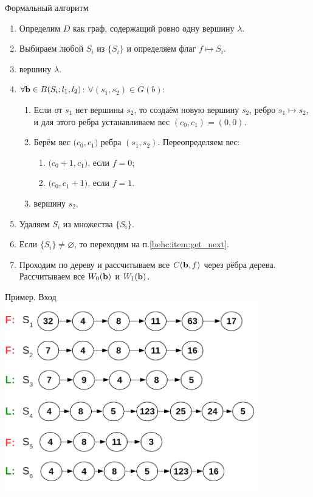 \begin{frame}{Формальный алгоритм}
	\small
	\begin{enumerate}
		\item Определим $D$ как граф, содержащий ровно одну вершину $\lambda$.
		\item Выбираем любой $S_i$ из $\big\{ S_i\big\}$ и определяем флаг $f \longmapsto S_i$.
			\label{behc:item:get_next}
		\item {} вершину $\lambda$.
		\item $\forall \bold b \in B(S_i; l_1, l_2)$:  
		$\forall (s_1, s_2) \in G(b)$: 
		\begin{enumerate}
			\item Если от  $s_1$ нет
			вершины $s_2$, то создаём новую вершину $s_2$, ребро $s_1 \longmapsto s_2$,
			и для этого ребра устанавливаем вес $(c_0,c_1)=(0,0)$.
			\item Берём вес $\big(c_0, c_1\big)$ ребра $(s_1, s_2)$.
			Переопределяем вес:
			\begin{enumerate}
				\item $\big(c_0 + 1, c_1\big)$, если $f=0$;
				\item $\big(c_0, c_1 +1 \big)$, если $f=1$.
			\end{enumerate}
			\item {} вершину $s_2$.
		\end{enumerate}
		\item Удаляем $S_i$ из множества $\big\{ S_i\big\}$.
		\item Если $\big\{ S_i\big\}\neq \varnothing$, то переходим на п.\ref{behc:item:get_next}.
		\item Проходим по дереву и рассчитываем все $C(\bold b, f)$
		через рёбра дерева. Рассчитываем все $W_0(\bold b)$ и $W_1(\bold b)$.
	\end{enumerate}	
\end{frame}

\begin{frame}{Пример. Вход}
	\centering
	\includegraphics[width=11cm]{../pic/beh/idea_2.png}
\end{frame}

